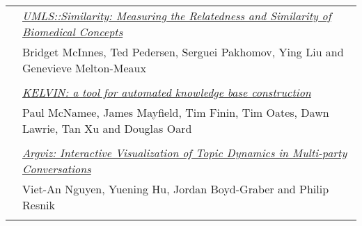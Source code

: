 \begin{tabular}{p{20mm}p{128mm}}
 & \hyperlink{page.28}{\em UMLS::Similarity: Measuring the Relatedness and Similarity of Biomedical Concepts}\\
         & Bridget McInnes, Ted Pedersen, Serguei Pakhomov, Ying Liu and Genevieve Melton-Meaux \\
\\

 & \hyperlink{page.32}{\em KELVIN: a tool for automated knowledge base construction}\\
         & Paul McNamee, James Mayfield, Tim Finin, Tim Oates, Dawn Lawrie, Tan Xu and Douglas Oard \\
\\

 & \hyperlink{page.36}{\em Argviz: Interactive Visualization of Topic Dynamics in Multi-party Conversations}\\
         & Viet-An Nguyen, Yuening Hu, Jordan Boyd-Graber and Philip Resnik \\
\\



\end{tabular}
